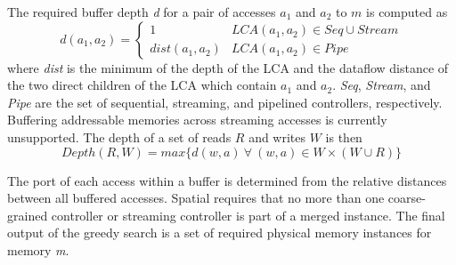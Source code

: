The required buffer depth \emph{d} for a pair of accesses $a_1$ and $a_2$ to $m$ is computed as
\[
d(a_1, a_2) = \left\{\begin{matrix} 1 & LCA(a_1, a_2) \in Seq \cup Stream \\ dist(a_1,a_2) & LCA(a_1,a_2) \in Pipe \end{matrix}\right.
\]
where \emph{dist} is the minimum of the depth of the LCA and the dataflow distance of the two direct children of the LCA which contain $a_1$ and $a_2$. \emph{Seq}, \emph{Stream}, and \emph{Pipe} are the set of sequential, streaming, and pipelined controllers, respectively. Buffering addressable memories across streaming accesses is currently unsupported.
The depth of a set of reads $R$ and writes $W$ is then
\[ Depth(R,W) = max\{ d(w,a)~\forall ~(w,a) \in W \times (W\cup R) \} \]

The port of each access within a buffer is determined from the relative distances between all buffered accesses.
Spatial requires that no more than one coarse-grained controller or streaming controller is part of a merged instance.
The final output of the greedy search is a set of required physical memory instances for memory \emph{m}.

